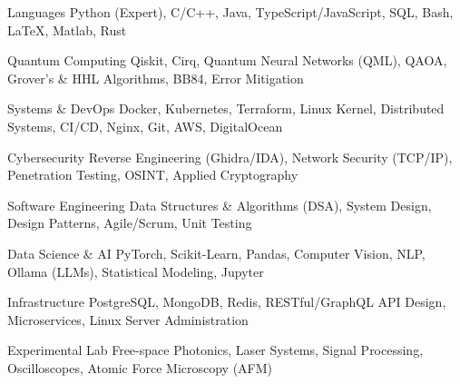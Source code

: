 

\begin{cvskills}

  \cvskill
    {Languages}
    {Python (Expert), C/C++, Java, TypeScript/JavaScript, SQL, Bash, LaTeX, Matlab, Rust}

  \cvskill
    {Quantum Computing}
    {Qiskit, Cirq, Quantum Neural Networks (QML), QAOA, Grover's \& HHL Algorithms, BB84, Error Mitigation}

  \cvskill
    {Systems \& DevOps}
    {Docker, Kubernetes, Terraform, Linux Kernel, Distributed Systems, CI/CD, Nginx, Git, AWS, DigitalOcean}

  \cvskill
    {Cybersecurity}
    {Reverse Engineering (Ghidra/IDA), Network Security (TCP/IP), Penetration Testing, OSINT, Applied Cryptography}

  \cvskill
    {Software Engineering}
    {Data Structures \& Algorithms (DSA), System Design, Design Patterns, Agile/Scrum, Unit Testing}

  \cvskill
    {Data Science \& AI}
    {PyTorch, Scikit-Learn, Pandas, Computer Vision, NLP, Ollama (LLMs), Statistical Modeling, Jupyter}

  \cvskill
    {Infrastructure}
    {PostgreSQL, MongoDB, Redis, RESTful/GraphQL API Design, Microservices, Linux Server Administration}

  \cvskill
    {Experimental Lab}
    {Free-space Photonics, Laser Systems, Signal Processing, Oscilloscopes, Atomic Force Microscopy (AFM)}
    

\end{cvskills}